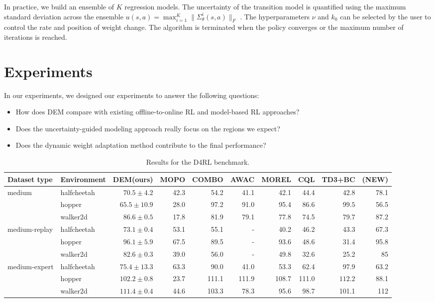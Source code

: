 \documentclass[conference]{IEEEtran}
\begin{document}
In practice, we build an ensemble of $K$ regression models. The uncertainty of the transition model is quantified using the maximum standard deviation across the ensemble $u(s, a) = \max_{i=1}^K \|\Sigma_{\theta}^i(s, a)\|_F$ \cite{mopo}. The hyperparameters \( \nu \) and \( k_0 \) can be selected by the user to control the rate and position of weight change. The algorithm is terminated when the policy converges or the maximum number of iterations is reached.

\section{Experiments}
In our experiments, we designed our experiments to answer the following questions:
\begin{itemize}
\item How does DEM compare with existing offline-to-online RL and model-based RL approaches?
\item Does the uncertainty-guided modeling approach really focus on the regions we expect?
\item Does the dynamic weight adaptation method contribute to the final performance?
\end{itemize}

\begin{table}[!tb]
  \centering
  \begin{tabular}{llrrrrrrrr}
    \toprule
    \textbf{Dataset type} & \textbf{Environment} & \textbf{DEM(ours)} &  \textbf{MOPO} & \textbf{COMBO} & \textbf{AWAC} & \textbf{MOREL} & \textbf{CQL} & \textbf{TD3+BC} & \textbf{(NEW)} \\
    \midrule
    medium & halfcheetah  & $\mathbf{70.5 \pm 4.2}$ & 42.3 & 54.2 & 41.1 & 42.1 & 44.4 & 42.8 & 78.1 \\
           & hopper  & $65.5 \pm 10.9$ & 28.0 & 97.2 & 91.0 & 95.4 & 86.6 & $\mathbf{99.5}$ & 56.5\\
           & walker2d  & $\mathbf{86.6 \pm 0.5}$ & 17.8 & 81.9 & 79.1 & 77.8 & 74.5 & 79.7 & 87.2\\

    medium-replay & halfcheetah  & $\mathbf{73.1 \pm 0.4}$ & 53.1 & 55.1 & - & 40.2 & 46.2 & 43.3 & 67.3\\
            & hopper  & $\mathbf{96.1 \pm 5.9}$ & 67.5 & 89.5 & - & 93.6 & 48.6 & 31.4 & 95.8\\
            & walker2d  & $\mathbf{82.6 \pm 0.3}$ & 39.0 & 56.0 & - & 49.8 & 32.6 & 25.2 & 85\\

    medium-expert & halfcheetah  & $75.4 \pm 13.3$ & 63.3 & 90.0 & 41.0 & 53.3 & 62.4 & $\mathbf{97.9}$ & 63.2\\
            & hopper  & $102.2 \pm 0.8$ & 23.7 & 111.1 & 111.9 & 108.7 & 111.0 & $\mathbf{112.2}$ & 88.1\\
            & walker2d  & $\mathbf{111.4 \pm 0.4}$ & 44.6 & 103.3 & 78.3 & 95.6 & 98.7 & 101.1 & 112\\
    \bottomrule
  \end{tabular}
  \caption{Results for the D4RL benchmark.}
  \label{tab:Performance}
\end{table}
\end{document}
